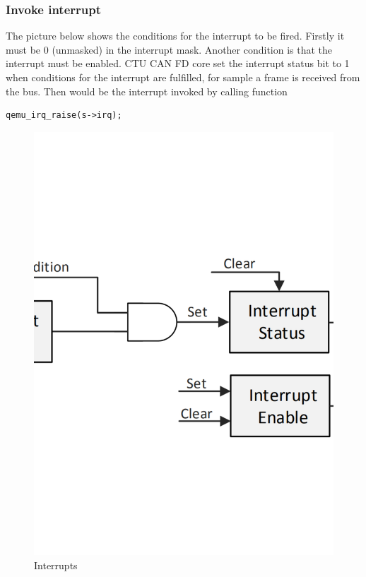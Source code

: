 \documentclass{ctuthesis}
\begin{document}
  \subsubsection{Invoke interrupt}
  The picture below shows the conditions for the interrupt to be fired. Firstly it must be 0 (unmasked) in the interrupt mask. Another condition is that the interrupt must be enabled. CTU CAN FD core set the interrupt status bit to 1 when conditions for the interrupt are fulfilled, for sample a frame is received from the bus. Then would be the interrupt invoked by calling function 
  \begin{verbatim}qemu_irq_raise(s->irq);\end{verbatim}
  \begin{figure}[H]
  \includegraphics[width=1\textwidth]{progdum-interrupts.pdf}
  \caption{Interrupts \cite{progdum}}
  \end{figure}
 
\end{document}
